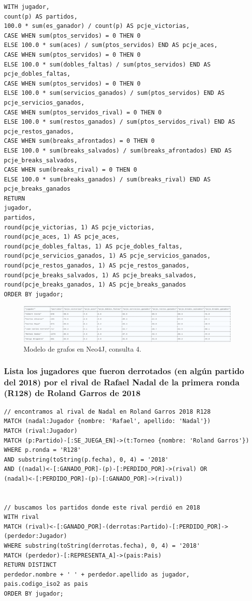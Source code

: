 \begin{verbatim}
WITH jugador,
count(p) AS partidos,
100.0 * sum(es_ganador) / count(p) AS pcje_victorias,
CASE WHEN sum(ptos_servidos) = 0 THEN 0
ELSE 100.0 * sum(aces) / sum(ptos_servidos) END AS pcje_aces,
CASE WHEN sum(ptos_servidos) = 0 THEN 0
ELSE 100.0 * sum(dobles_faltas) / sum(ptos_servidos) END AS pcje_dobles_faltas,
CASE WHEN sum(ptos_servidos) = 0 THEN 0
ELSE 100.0 * sum(servicios_ganados) / sum(ptos_servidos) END AS pcje_servicios_ganados,
CASE WHEN sum(ptos_servidos_rival) = 0 THEN 0
ELSE 100.0 * sum(restos_ganados) / sum(ptos_servidos_rival) END AS pcje_restos_ganados,
CASE WHEN sum(breaks_afrontados) = 0 THEN 0
ELSE 100.0 * sum(breaks_salvados) / sum(breaks_afrontados) END AS pcje_breaks_salvados,
CASE WHEN sum(breaks_rival) = 0 THEN 0
ELSE 100.0 * sum(breaks_ganados) / sum(breaks_rival) END AS pcje_breaks_ganados
RETURN
jugador,
partidos,
round(pcje_victorias, 1) AS pcje_victorias,
round(pcje_aces, 1) AS pcje_aces,
round(pcje_dobles_faltas, 1) AS pcje_dobles_faltas,
round(pcje_servicios_ganados, 1) AS pcje_servicios_ganados,
round(pcje_restos_ganados, 1) AS pcje_restos_ganados,
round(pcje_breaks_salvados, 1) AS pcje_breaks_salvados,
round(pcje_breaks_ganados, 1) AS pcje_breaks_ganados
ORDER BY jugador;
\end{verbatim}

\begin{figure}[H]
\centering
\includegraphics[width=\textwidth]{fotos/q4_neo.png}
\caption{Modelo de grafos en Neo4J, consulta 4.}
\label{fig:q4_neo}
\end{figure}





\subsubsection{Lista los jugadores que fueron derrotados (en algún partido del 2018) por el rival de Rafael Nadal de la primera ronda (R128) de Roland Garros de 2018}

\begin{verbatim}
// encontramos al rival de Nadal en Roland Garros 2018 R128
MATCH (nadal:Jugador {nombre: 'Rafael', apellido: 'Nadal'})
MATCH (rival:Jugador)
MATCH (p:Partido)-[:SE_JUEGA_EN]->(t:Torneo {nombre: 'Roland Garros'})
WHERE p.ronda = 'R128'
AND substring(toString(p.fecha), 0, 4) = '2018'
AND ((nadal)<-[:GANADO_POR]-(p)-[:PERDIDO_POR]->(rival) OR
(nadal)<-[:PERDIDO_POR]-(p)-[:GANADO_POR]->(rival))


// buscamos los partidos donde este rival perdió en 2018
WITH rival
MATCH (rival)<-[:GANADO_POR]-(derrotas:Partido)-[:PERDIDO_POR]->(perdedor:Jugador)
WHERE substring(toString(derrotas.fecha), 0, 4) = '2018'
MATCH (perdedor)-[:REPRESENTA_A]->(pais:Pais)
RETURN DISTINCT
perdedor.nombre + ' ' + perdedor.apellido as jugador,
pais.codigo_iso2 as pais
ORDER BY jugador;
\end{verbatim}

